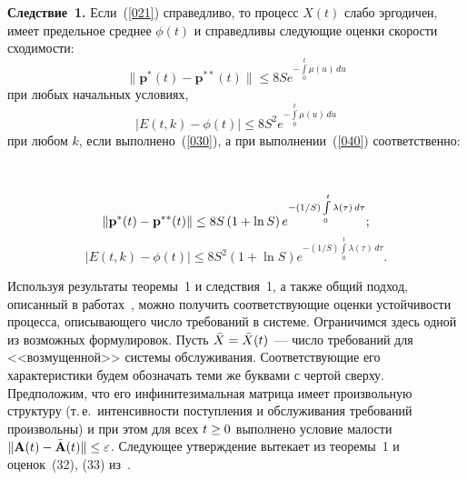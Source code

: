 {\begin{multicols}{2}
\medskip

\noindent
\textbf{Следствие~1.}
Если~(\ref{021}) справедливо, то процесс $X(t)$ слабо эргодичен,
имеет предельное  среднее $\phi(t)$ и справедливы следующие оценки скорости
сходимости:
\begin{equation*}
\|\mathbf {p}^*(t)-\mathbf {p}^{**}(t)\| \le 8Se^{-\int\limits_0^t {\mu(u)\,du}}
\end{equation*}
при любых начальных условиях,
\begin{equation*}
|E(t,k)-\phi(t)|\le 8S^2e^{-\int\limits_0^t {\mu(u)\,du}}
\end{equation*}
при любом $k$,  если выполнено~(\ref{030}), а при выполнении~(\ref{040})
соответственно:

\begin{figure*}[b] %
\vspace*{1pt}
\begin{center}
\mbox{%
\epsfxsize=161.688mm
}
\end{center}
\vspace*{-15pt}
\end{figure*}


\pagebreak

\noindent
\begin{equation*}
\|{\bf p^*}(t) - {\bf p^{**}}(t)\| \le
8S\left(1+\ln S\right)  e^{-(1/S)\int\limits_0^t\lambda (\tau)\,d\tau};
\label{053*}
\end{equation*}
\begin{equation*}
|E(t,k)-\phi(t)|\le  8S^2\left(1+\ln S\right)
e^{-(1/S)\int\limits_0^t\lambda (\tau)\,d\tau}.
\end{equation*}



\smallskip

Используя результаты теоремы~1 и следствия~1, а также общий подход,
описанный в работах~\cite{z14a,z14b,z14d}, можно получить
соответст\-ву\-ющие оценки устойчивости процесса, описывающего чис\-ло
требований в системе. Ограничимся здесь одной из возможных
формулировок. Пусть $\bar{X}\hm=\bar{X}(t)$~--- число требований для
<<возмущенной>> системы обслуживания. Соответствующие его
характеристики будем обозначать теми же буквами с чертой сверху.
Предположим, что его инфинитезимальная матрица имеет произвольную
структуру (т.\,е.\ интенсивности поступления и обслуживания
требований произвольны) и при этом для всех $t \hm\ge 0$ выполнено
условие малости $\| \A(t)\hm-\bar{\A}(t)\| \hm\le \varepsilon$. Следующее
утверждение вытекает из теоремы~1 и оценок~(32), (33) из~\cite{z14a}.


\end{multicols}}
